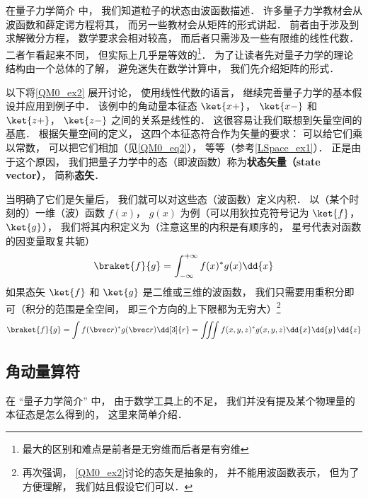 

在量子力学简介 中， 我们知道粒子的状态由波函数描述． 许多量子力学教材会从波函数和薛定谔方程将其， 而另一些教材会从矩阵的形式讲起． 前者由于涉及到求解微分方程， 数学要求会相对较高， 而后者只需涉及一些有限维的线性代数． 二者乍看起来不同， 但实际上几乎是等效的\footnote{最大的区别和难点是前者是无穷维而后者是有穷维}． 为了让读者先对量子力学的理论结构由一个总体的了解， 避免迷失在数学计算中， 我们先介绍矩阵的形式．

以下将\autoref{QM0_ex2} 展开讨论， 使用线性代数的语言， 继续完善量子力学的基本假设并应用到例子中． 该例中的角动量本征态 $\ket{x+}$， $\ket{x-}$ 和 $\ket{z+}$， $\ket{z-}$ 之间的关系是线性的． 这很容易让我们联想到矢量空间的基底． 根据矢量空间的定义， 这四个本征态符合作为矢量的要求： 可以给它们乘以常数， 可以把它们相加（见\autoref{QM0_eq2}）， 等等（参考\autoref{LSpace_ex1}）． 正是由于这个原因， 我们把量子力学中的态（即波函数）称为\textbf{状态矢量（state vector）}， 简称\textbf{态矢}．

当明确了它们是矢量后， 我们就可以对这些态（波函数）定义内积． 以（某个时刻的）一维（波）函数 $f(x)$， $g(x)$ 为例（可以用狄拉克符号记为 $\ket{f}$， $\ket{g}$）， 我们将其内积定义为（注意这里的内积是有顺序的， 星号代表对函数的因变量取复共轭）%
\begin{equation}
\braket{f}{g} = \int_{-\infty}^{+\infty} f(x)^* g(x) \dd{x}
\end{equation}
如果态矢 $\ket{f}$ 和 $\ket{g}$ 是二维或三维的波函数， 我们只需要用重积分即可（积分的范围是全空间， 即三个方向的上下限都为无穷大）\footnote{再次强调， \autoref{QM0_ex2}讨论的态矢是抽象的， 并不能用波函数表示， 但为了方便理解， 我们姑且假设它们可以．}
\begin{equation}
\braket{f}{g} = \int f(\bvec r)^* g(\bvec r) \dd[3]{r} = \iiint f(x, y, z)^* g(x, y, z) \dd{x}\dd{y}\dd{z}
\end{equation}


\subsection{角动量算符}
在 “量子力学简介” 中， 由于数学工具上的不足， 我们并没有提及某个物理量的本征态是怎么得到的， 这里来简单介绍．

